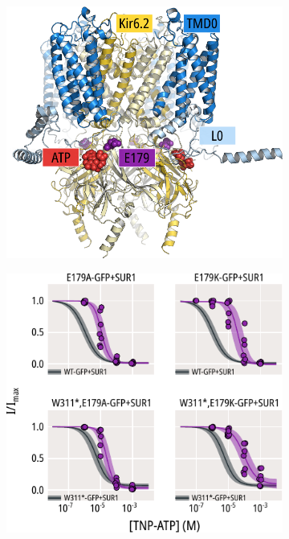 \begin{figure}[hbtp]
	\centering
	\begin{subfigure}[t]{0.45\textwidth}
		\caption{}\label{ch5fig:e179_loc}
		\centering
		\includegraphics[width=\textwidth]{e179_1.pdf}
	\end{subfigure}
	\hfill
	\begin{subfigure}[t]{0.45\textwidth}
		\caption{}\label{ch5fig:e179_tnpatp_popfits_1}
		\centering
		\includegraphics[width=\textwidth]{e179_3.pdf}

\end{subfigure}
\end{figure}
